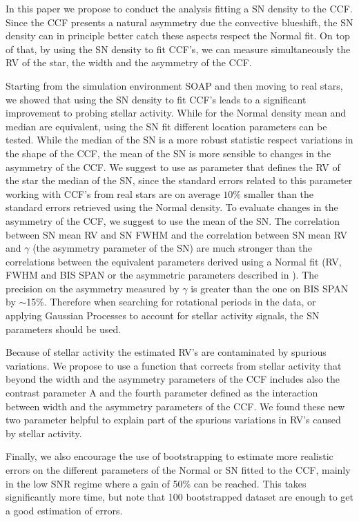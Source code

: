 \documentclass{aa}
\begin{document}
In this paper we propose to conduct the analysis fitting a SN density to the CCF. Since the CCF presents a natural asymmetry due the convective blueshift, the SN density can in principle better catch these aspects respect the Normal fit. On top of that, by using the SN density to fit CCF's, we can measure simultaneously the RV of the star, the width and the asymmetry of the CCF.

Starting from the simulation environment SOAP and then moving to real stars, we showed that using the SN density to fit CCF's leads to a significant improvement to probing stellar activity. While for the Normal density mean and median are equivalent, using the SN fit different location parameters can be tested. While the median of the SN is a more robust statistic respect variations in the shape of the CCF, the mean of the SN is more sensible to changes in the asymmetry of the CCF. We suggest to use as parameter that defines the RV of the star the median of the SN, since the standard errors related to this parameter working with CCF's from real stars are on average $10\%$ smaller than the standard errors retrieved using the Normal density. To evaluate changes in the asymmetry of the CCF, we suggest to use the mean of the SN. The correlation between SN mean RV and SN FWHM and the correlation between SN mean RV and $\gamma$ (the asymmetry parameter of the SN) are much stronger than the correlations between the equivalent parameters derived using a Normal fit (RV, FWHM and BIS SPAN or the asymmetric parameters described in \citet{Figueira-2013}). The precision on the asymmetry measured by $\gamma$ is greater than the one on BIS SPAN by $\sim$15\%. Therefore when searching for rotational periods in the data, or applying Gaussian Processes to account for stellar activity signals, the SN parameters should be used.

Because of stellar activity the estimated RV's are contaminated by spurious variations. We propose to use a function that corrects from stellar activity that beyond the width and the asymmetry parameters of the CCF includes also the contrast parameter A and the fourth parameter defined as the interaction between width and the asymmetry parameters of the CCF. We found these new two parameter helpful to explain part of the spurious variations in RV's caused by stellar activity.

Finally, we also encourage the use of bootstrapping to estimate more realistic errors on the different parameters of the Normal or SN fitted to the CCF, mainly in the low SNR regime where a gain of 50\% can be reached. This takes significantly more time, but note that 100 bootstrapped dataset are enough to get a good estimation of errors.
\end{document}
